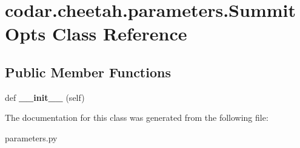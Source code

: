 \hypertarget{classcodar_1_1cheetah_1_1parameters_1_1_summit_opts}{}\section{codar.\+cheetah.\+parameters.\+Summit\+Opts Class Reference}
\label{classcodar_1_1cheetah_1_1parameters_1_1_summit_opts}
\subsection*{Public Member Functions}
\begin{DoxyCompactItemize}
\item 
\mbox{\label{classcodar_1_1cheetah_1_1parameters_1_1_summit_opts_af6fc797d0f898578303c36ea352efbe3}} 
def {\bfseries \+\_\+\+\_\+init\+\_\+\+\_\+} (self)
\end{DoxyCompactItemize}


The documentation for this class was generated from the following file\+:\begin{DoxyCompactItemize}
\item 
parameters.\+py\end{DoxyCompactItemize}
